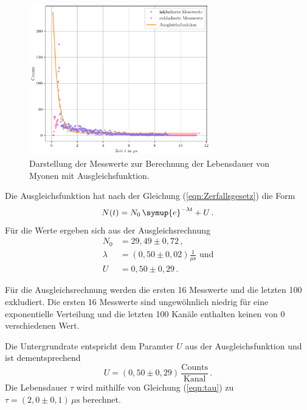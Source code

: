 \begin{figure}
  \centering
  \includegraphics[width=0.70\textwidth]{Lebensdauer_der_Myonen.pdf}
  \caption{Darstellung der Messwerte zur Berechnung der Lebensdauer von Myonen mit Ausgleichsfunktion.}
  \label{fig:Lebensdauer_Myonen}
\end{figure}

Die Ausgleichsfunktion hat nach der Gleichung (\ref{eqn:Zerfallsgesetz}) die Form 
$$ N(t) = N_0 \,\symup{e}^{-\lambda t} + U \,.$$
Für die Werte ergeben sich aus der Ausgleichsrechnung 
\begin{align*}
  N_0 &= 29,49 \pm 0,72 \, ,\\
  \lambda &= (0,50 \pm 0,02) \frac{1}{\unit{\mu\second}} \,\, \text{und}\\
  U &= 0,50 \pm 0,29 \, .
\end{align*}

Für die Ausgleichsrechnung werden 
die ersten 16 Messwerte und die letzten 100 exkludiert. Die ersten 16
Messwerte sind ungewöhnlich niedrig für eine exponentielle Verteilung 
und die letzten 100 Kanäle enthalten keinen von 0 verschiedenen Wert. 

Die Untergrundrate entspricht dem Paramter $U$ aus der Ausgleichsfunktion 
und ist dementsprechend $$U = (0,50 \pm 0,29) \, \frac{\text{Counts}}{\text{Kanal}}\,.$$
Die Lebensdauer $\tau$ wird mithilfe von Gleichung (\ref{eqn:tau}) zu 
$\tau = (2,0 \pm 0,1) \, \unit{\mu\second} $ berechnet.


\FloatBarrier

